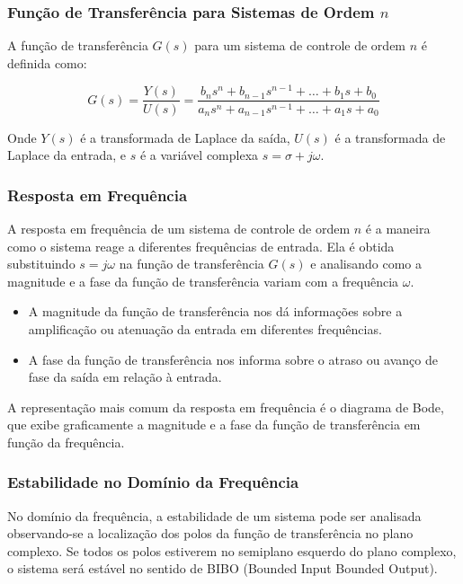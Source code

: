 \documentclass[a4paper,12pt]{article}
\begin{document}
\subsubsection{Função de Transferência para Sistemas de Ordem \(n\)}

A função de transferência \(G(s)\) para um sistema de controle de ordem \(n\) é definida como:

\begin{equation*}
    G(s) = \frac{Y(s)}{U(s)} = \frac{b_ns^n + b_{n-1}s^{n-1} + \ldots + b_1s + b_0}{a_ns^n + a_{n-1}s^{n-1} + \ldots + a_1s + a_0} \tag{2.4.1}
\end{equation*}

Onde \(Y(s)\) é a transformada de Laplace da saída, \(U(s)\) é a transformada de Laplace da entrada, e \(s\) é a variável complexa \(s = \sigma + j\omega\).

\subsubsection{Resposta em Frequência}

A resposta em frequência de um sistema de controle de ordem \(n\) é a maneira como o sistema reage a diferentes frequências de entrada. Ela é obtida substituindo \(s = j\omega\) na função de transferência \(G(s)\) e analisando como a magnitude e a fase da função de transferência variam com a frequência \(\omega\).
\begin{itemize}
    \item A magnitude da função de transferência nos dá informações sobre a amplificação ou atenuação da entrada em diferentes frequências.
    \item A fase da função de transferência nos informa sobre o atraso ou avanço de fase da saída em relação à entrada.
\end{itemize}
A representação mais comum da resposta em frequência é o diagrama de Bode, que exibe graficamente a magnitude e a fase da função de transferência em função da frequência.

\subsubsection{Estabilidade no Domínio da Frequência}

No domínio da frequência, a estabilidade de um sistema pode ser analisada observando-se a localização dos polos da função de transferência no plano complexo. Se todos os polos estiverem no semiplano esquerdo do plano complexo, o sistema será estável no sentido de BIBO (Bounded Input Bounded Output).
\end{document}
